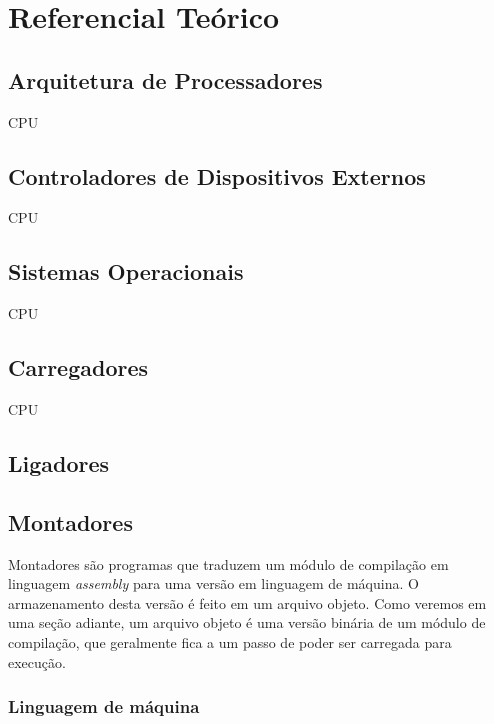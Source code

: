
\chapter{Referencial Teórico}

\section{Arquitetura de Processadores}

CPU

\section{Controladores de Dispositivos Externos}

CPU

\section{Sistemas Operacionais}

CPU

\section{Carregadores}

CPU

\section{Ligadores}




\section{Montadores}

Montadores são programas que traduzem um módulo de compilação em linguagem \textit{assembly} para uma versão em linguagem de máquina. O armazenamento desta versão é feito em um arquivo objeto. Como veremos em uma seção adiante, um arquivo objeto é uma versão binária de um módulo de compilação, que geralmente fica a um passo de poder ser carregada para execução.

\subsection{Linguagem de máquina}

